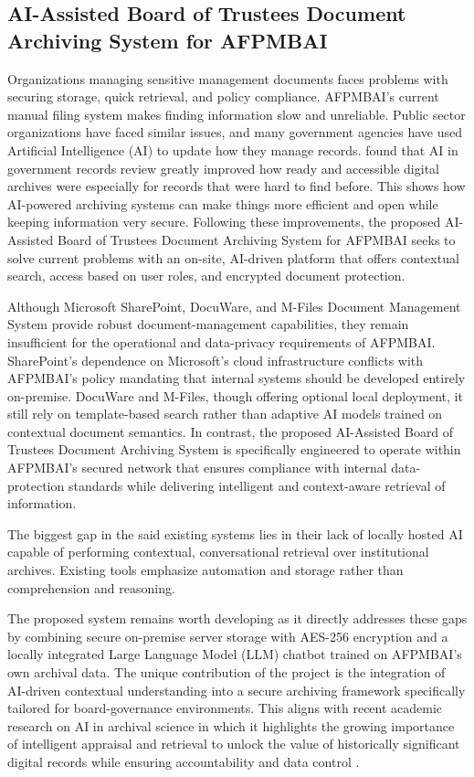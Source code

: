 \subsection{AI-Assisted Board of Trustees Document Archiving System for AFPMBAI}

Organizations managing sensitive management documents faces problems with securing storage, quick retrieval, and policy compliance. AFPMBAI's current manual filing system makes finding information slow and unreliable. Public sector organizations have faced similar issues, and many government agencies have used Artificial Intelligence (AI) to update how they manage records. \cite{canning2025governmentrecords} found that AI in government records review greatly improved how ready and accessible digital archives were especially for records that were hard to find before. This shows how AI-powered archiving systems can make things more efficient and open while keeping information very secure. Following these improvements, the proposed AI-Assisted Board of Trustees Document Archiving System for AFPMBAI seeks to solve current problems with an on-site, AI-driven platform that offers contextual search, access based on user roles, and encrypted document protection.

Although Microsoft SharePoint, DocuWare, and M-Files Document Management System provide robust document-management capabilities, they remain insufficient for the operational and data-privacy requirements of AFPMBAI. SharePoint’s dependence on Microsoft’s cloud infrastructure conflicts with AFPMBAI’s policy mandating that internal systems should be developed entirely on-premise. DocuWare and M-Files, though offering optional local deployment, it still rely on template-based search rather than adaptive AI models trained on contextual document semantics. In contrast, the proposed AI-Assisted Board of Trustees Document Archiving System is specifically engineered to operate within AFPMBAI’s secured network that ensures compliance with internal data-protection standards while delivering intelligent and context-aware retrieval of information.

The biggest gap in the said existing systems lies in their lack of locally hosted AI capable of performing contextual, conversational retrieval over institutional archives. Existing tools emphasize automation and storage rather than comprehension and reasoning.

The proposed system remains worth developing as it directly addresses these gaps by combining secure on-premise server storage with AES-256 encryption and a locally integrated Large Language Model (LLM) chatbot trained on AFPMBAI’s own archival data. The unique contribution of the project is the integration of AI-driven contextual understanding into a secure archiving framework specifically tailored for board-governance environments. This aligns with recent academic research on AI in archival science in which it highlights the growing importance of intelligent appraisal and retrieval to unlock the value of historically significant digital records while ensuring accountability and data control \citep{canning2025governmentrecords}.
